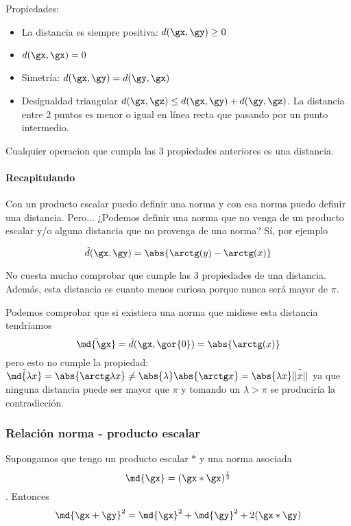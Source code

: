 \documentclass{apuntes}
\begin{document}
Propiedades:
\begin{itemize}
 \item La distancia es siempre positiva: $d(\gx,\gy)\ge 0$
 \item $d(\gx,\gx) = 0$
 \item Simetría: $d(\gx,\gy) = d(\gy, \gx)$
 \item Desigualdad triangular $d(\gx,\gz) \leq d(\gx,\gy) + d(\gy,\gz)$. La distancia entre 2 puntos es menor o igual en línea recta que pasando por un punto intermedio.
\end{itemize}


\begin{defn}[Distancia] Cualquier operacion que cumpla las 3 propiedades anteriores es una distancia. \end{defn}

\paragraph{Recapitulando}
Con un producto escalar puedo definir una norma y con esa norma puedo definir una distancia. Pero... ¿Podemos definir una norma 
que no venga de un producto escalar y/o alguna distancia que no provenga de una norma? Sí, por ejemplo

\[ \tilde{d} (\gx,\gy) = \abs{\arctg(y) - \arctg(x)} \] 

No cuesta mucho comprobar que cumple las 3 propiedades de una distancia. Además, esta distancia es cuanto menos curiosa porque nunca será mayor de $\pi$.

 Podemos comprobar que si existiera una norma que midiese esta distancia tendríamos \[\tilde{\md{\gx}} = \tilde{d} (\gx,\gor{0}) = \abs{\arctg (x)} \]
 pero esto no cumple la propiedad: $\tilde{\md{\lambda x}} = \abs{\arctg \lambda x} \neq \abs{\lambda}\abs{\arctg x} = 
 \abs{\lambda x}\tilde{||x||}$
 ya que ninguna distancia puede ser mayor que $\pi$ y tomando un $\lambda > \pi$ se produciría la contradicción.

\subsubsection{Relación norma - producto escalar}
\label{secNormaprodEsc}
\begin{theorem}
Supongamos que tengo un producto escalar $\ast$ y una norma asociada \[ \md{\gx} = (\gx\ast \gx) ^ {\frac{1}{2}}\]. Entonces \[ \md{\gx + \gy}^ 2 =  \md{\gx} ^ 2 + \md{\gy} ^ 2+2(\gx\ast\gy) \]
\end{theorem}
\end{document}
